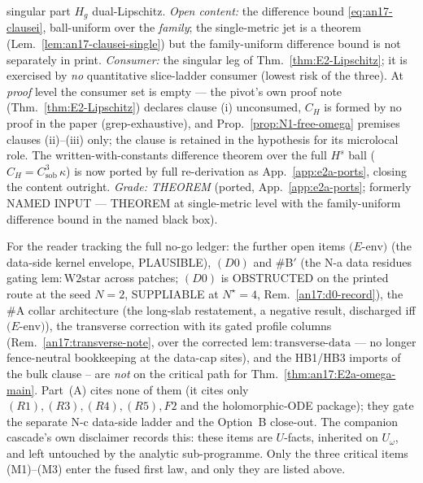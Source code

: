 \begin{enumerate}[label=\textup{(M\arabic*)},leftmargin=*]
{    singular part $H_g$ dual-Lipschitz.}  \emph{Open content:} the
    difference bound \eqref{eq:an17-clausei}, ball-uniform over the
    \emph{family}; the single-metric jet is a theorem
    (Lem.~\ref{lem:an17-clausei-single}) but the family-uniform
    difference bound is not separately in print.  \emph{Consumer:} the
    singular leg of Thm.~\ref{thm:E2-Lipschitz}; it is exercised by
    \emph{no} quantitative slice-ladder consumer (lowest risk of the
    three). At \emph{proof} level the consumer set is
    empty --- the pivot's own proof note (Thm.~\ref{thm:E2-Lipschitz})
    declares clause (i) unconsumed, $C_H$ is formed by no proof in the
    paper (grep-exhaustive), and Prop.~\ref{prop:N1-free-omega}
    premises clauses (ii)--(iii) only; the clause is retained in the
    hypothesis for its microlocal role. The written-with-constants
    difference theorem over the full $H^s$ ball
    ($C_H=C_{\mathrm{sob}}^{3}\,\kappa$) is now ported by full
    re-derivation as App.~\ref{app:e2a-ports}, closing the content
    outright.  \emph{Grade: THEOREM} (ported, App.~\ref{app:e2a-ports};
    formerly NAMED INPUT --- THEOREM at single-metric level with the
    family-uniform difference bound in the named black box).
\end{enumerate}

\begin{remark}\label{rem:an17-orthogonal}
For the reader tracking the full no-go ledger: the further open items
$(E$-$\mathrm{env})$ (the data-side kernel envelope, PLAUSIBLE), $(D0)$
and \#B$'$ (the N-a data residues gating $\mathrm{lem:W2star}$ across
patches; $(D0)$ is OBSTRUCTED on the printed route at the seed $N{=}2$, SUPPLIABLE
at $N^\star{=}4$, Rem.~\ref{an17:d0-record}), the \#A collar architecture (the long-slab
restatement, a negative result, discharged iff $(E$-$\mathrm{env})$), the
transverse correction with its gated profile columns
(Rem.~\ref{an17:transverse-note}, over the corrected
$\mathrm{lem:transverse\text{-}data}$ --- no longer fence-neutral
bookkeeping at the data-cap sites), and the HB1/HB3 imports of
the bulk clause -- are \emph{not} on the critical path for
Thm.~\ref{thm:an17:E2a-omega-main}.  Part~(A) cites none of them (it
cites only $(R1),(R3),(R4),(R5),F2$ and the holomorphic-ODE package); they
gate the separate N-c data-side ladder and the Option~B close-out.  The
companion cascade's own disclaimer records this: these items are
$U$-facts, inherited on $U_\omega$, and left untouched by the analytic
sub-programme.  Only the three critical items (M1)--(M3) enter the fused
first law, and only they are listed above.
\end{remark}

